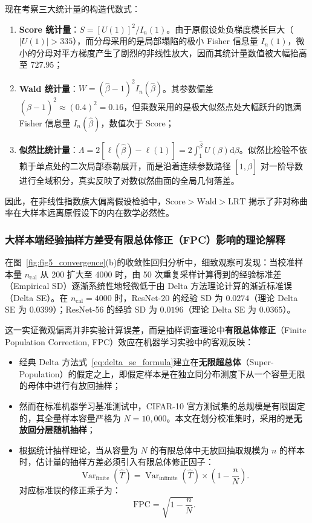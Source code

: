 现在考察三大统计量的构造代数式：
\begin{enumerate}
\item \textbf{Score 统计量}：$S = [U(1)]^2 / I_n(1)$。由于原假设处负梯度模长巨大（$|U(1)| > 335$），而分母采用的是局部塌陷的极小 Fisher 信息量 $I_n(1)$，微小的分母对平方梯度产生了剧烈的非线性放大，因而其统计量数值被大幅抬高至 $727.95$；
\item \textbf{Wald 统计量}：$W = (\hat\beta - 1)^2 I_n(\hat\beta)$。其参数偏差 $(\hat\beta - 1)^2 \approx (0.4)^2 = 0.16$，但乘数采用的是极大似然点处大幅跃升的饱满 Fisher 信息量 $I_n(\hat\beta)$，数值次于 Score；
\item \textbf{似然比统计量}：$\Lambda = 2[\ell(\hat\beta) - \ell(1)] = 2 \int_1^{\hat\beta} U(\beta)\mathrm{d}\beta$。似然比检验不依赖于单点处的二次局部泰勒展开，而是沿着连续参数路径 $[1, \hat\beta]$ 对一阶导数进行全域积分，真实反映了对数似然曲面的全局几何落差。
\end{enumerate}
因此，在非线性指数族大偏离假设检验中，$\text{Score} > \text{Wald} > \text{LRT}$ 揭示了非对称曲率在大样本远离原假设下的内在数学必然性。

\subsubsection{大样本端经验抽样方差受有限总体修正（FPC）影响的理论解释}

在图~\ref{fig:fig5_convergence}(b)的收敛性回归分析中，细致观察可发现：当校准样本量 $n_{\mathrm{cal}}$ 从 200 扩大至 4000 时，由 50 次重复采样计算得到的经验标准差（Empirical SD）逐渐系统性地轻微低于由 Delta 方法理论计算的渐近标准误（Delta SE）。在 $n_{\mathrm{cal}} = 4000$ 时，ResNet-20 的经验 SD 为 $0.0274$（理论 Delta SE 为 $0.0399$）；ResNet-56 的经验 SD 为 $0.0196$（理论 Delta SE 为 $0.0365$）。

这一实证微观偏离并非实验计算误差，而是抽样调查理论中\textbf{有限总体修正}（Finite Population Correction, FPC）效应在机器学习实验中的客观反映：
\begin{itemize}
\item 经典 Delta 方法式~\eqref{eq:delta_se_formula}建立在\textbf{无限超总体}（Super-Population）的假定之上，即假定样本是在独立同分布测度下从一个容量无限的母体中进行有放回抽样；
\item 然而在标准机器学习基准测试中，CIFAR-10 官方测试集的总规模是有限固定的，其全量样本容量严格为 $N = 10{,}000$。本文在划分校准集时，采用的是\textbf{无放回分层随机抽样}；
\item 根据统计抽样理论，当从容量为 $N$ 的有限总体中无放回抽取规模为 $n$ 的样本时，估计量的抽样方差必须引入有限总体修正因子：
\begin{equation}\label{eq:fpc_formula}
\operatorname{Var}_{\mathrm{finite}}(\hat T) = \operatorname{Var}_{\mathrm{infinite}}(\hat T) \times \left(1 - \frac{n}{N}\right).
\end{equation}
对应标准误的修正乘子为：
\begin{equation}\label{eq:fpc_se}
\mathrm{FPC} = \sqrt{1 - \frac{n}{N}}.
\end{equation}
\end{itemize}

